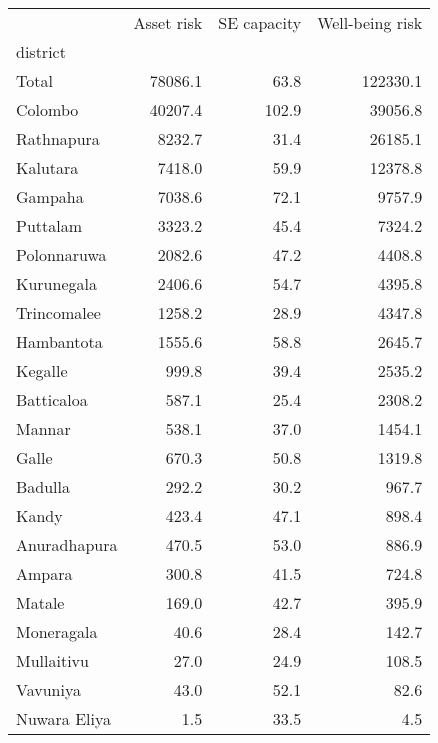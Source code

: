 \begin{tabular}{lrrr}
\toprule
{} &  Asset risk &  SE capacity &  Well-being risk \\
district     &             &              &                  \\
\midrule
Total        &     78086.1 &         63.8 &         122330.1 \\
Colombo      &     40207.4 &        102.9 &          39056.8 \\
Rathnapura   &      8232.7 &         31.4 &          26185.1 \\
Kalutara     &      7418.0 &         59.9 &          12378.8 \\
Gampaha      &      7038.6 &         72.1 &           9757.9 \\
Puttalam     &      3323.2 &         45.4 &           7324.2 \\
Polonnaruwa  &      2082.6 &         47.2 &           4408.8 \\
Kurunegala   &      2406.6 &         54.7 &           4395.8 \\
Trincomalee  &      1258.2 &         28.9 &           4347.8 \\
Hambantota   &      1555.6 &         58.8 &           2645.7 \\
Kegalle      &       999.8 &         39.4 &           2535.2 \\
Batticaloa   &       587.1 &         25.4 &           2308.2 \\
Mannar       &       538.1 &         37.0 &           1454.1 \\
Galle        &       670.3 &         50.8 &           1319.8 \\
Badulla      &       292.2 &         30.2 &            967.7 \\
Kandy        &       423.4 &         47.1 &            898.4 \\
Anuradhapura &       470.5 &         53.0 &            886.9 \\
Ampara       &       300.8 &         41.5 &            724.8 \\
Matale       &       169.0 &         42.7 &            395.9 \\
Moneragala   &        40.6 &         28.4 &            142.7 \\
Mullaitivu   &        27.0 &         24.9 &            108.5 \\
Vavuniya     &        43.0 &         52.1 &             82.6 \\
Nuwara Eliya &         1.5 &         33.5 &              4.5 \\
\bottomrule
\end{tabular}
